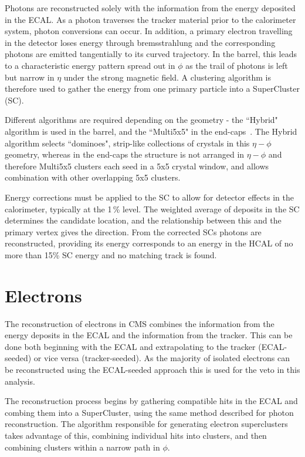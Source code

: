 Photons are reconstructed solely with the information from the energy deposited in the ECAL. As a photon traverses the tracker material prior to the calorimeter system, photon conversions can occur.  In addition, a primary electron travelling in the detector loses energy through bremsstrahlung and the corresponding photons are emitted tangentially to its curved trajectory. In the barrel, this leads to a characteristic energy pattern spread out in $\phi$ as the trail of photons is left but narrow in $\eta$ under the strong magnetic field. A clustering algorithm is therefore used to gather the energy from one primary particle into a SuperCluster (SC).

 Different algorithms are required depending on the geometry - the ``Hybrid" algorithm is used in the barrel, and the ``Multi5x5" in the end-caps~\cite{EGM-10-005}. The Hybrid algorithm selects ``dominoes", strip-like collections of crystals in this $\eta - \phi$ geometry, whereas in the end-caps the structure is not arranged in $\eta - \phi$ and therefore Multi5x5 clusters each seed in a 5x5 crystal window, and allows combination with other overlapping 5x5 clusters.

Energy corrections must be applied to the SC to allow for detector effects in the calorimeter, typically at the 1\,\% level. The weighted average of deposits in the SC determines the candidate location, and the relationship between this and the primary vertex gives the direction. From the corrected SCs photons are reconstructed, providing its energy corresponds to an energy in the HCAL of no more than 15\% SC energy and no matching track is found. 

\section{Electrons}

The reconstruction of electrons in CMS combines the information from the energy deposits in the ECAL and the information from the tracker. This can be done both beginning with the ECAL and extrapolating to the tracker (ECAL-seeded) or vice versa (tracker-seeded). As the majority of isolated electrons can be reconstructed using the ECAL-seeded approach this is used for the veto in this analysis. 

The reconstruction process begins by gathering compatible hits in the ECAL and combing them into a SuperCluster, using the same method described for photon reconstruction. The algorithm responsible for generating electron superclusters takes advantage of this, combining individual hits into clusters, and then combining clusters within a narrow path in $\phi$. 

